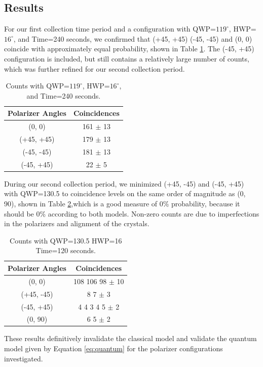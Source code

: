 \documentclass{article}
\begin{document}
\subsection{Results}

For our first collection time period and a configuration with QWP=$119^{\circ}$, HWP=$16^{\circ}$, and Time=240 seconds, we confirmed that (+45, +45) (-45, -45) and (0, 0) coincide with approximately equal probability, shown in Table \ref{tab:take1}. The (-45, +45) configuration is included, but still contains a relatively large number of counts, which was further refined for our second collection period.

\begin{table}[!h]
  \centering
  \begin{tabular}{ c c }
    Polarizer Angles & Coincidences \\ \hline
    (0, 0) & 161 $\pm$ 13 \\
    (+45, +45) & 179 $\pm$ 13\\
    (-45, -45) & 181 $\pm$ 13 \\
    (-45, +45) & 22 $\pm$ 5
  \end{tabular}
  \caption{Counts with QWP=$119^{\circ}$, HWP=$16^{\circ}$, and Time=240 seconds. \label{tab:take1}}
\end{table}

During our second collection period, we minimized (+45, -45) and (-45, +45) with QWP=130.5 to coincidence levels on the same order of magnitude as (0, 90), shown in Table \ref{tab:take2},which is a good measure of 0\% probability, because it should be 0\% according to both models. Non-zero counts are due to imperfections in the polarizers and alignment of the crystals.

\begin{table}[!h]
  \centering
  \begin{tabular}{ c c }
    Polarizer Angles & Coincidences \\ \hline
    (0, 0) & 108 106 98 $\pm$ 10 \\
    (+45, -45) & 8 7 $\pm$ 3 \\
    (-45, +45) & 4 4 3 4 5 $\pm$ 2\\
    (0, 90) & 6 5 $\pm$ 2
  \end{tabular}
  \caption{Counts with QWP=130.5 HWP=16 Time=120 seconds. \label{tab:take2}}
\end{table}

These results definitively invalidate the classical model and validate the quantum model given by Equation \ref{eq:quantum} for the polarizer configurations investigated.
\end{document}
